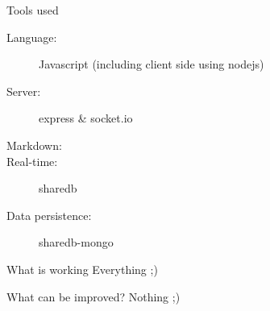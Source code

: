 \documentclass[11pt]{beamer}
\begin{document}
\begin{frame}{Tools used}
	\begin{description}
		\item[Language:] Javascript (including client side using nodejs)
		\item[Server:] express \& socket.io
		\item[Markdown:]
		\item[Real-time:] sharedb
		\item[Data persistence:] sharedb-mongo
	\end{description}
\end{frame}

\begin{frame}{What is working}
	Everything ;)
\end{frame}

\begin{frame}{What can be improved?}
	Nothing ;)
\end{frame}
\end{document}
